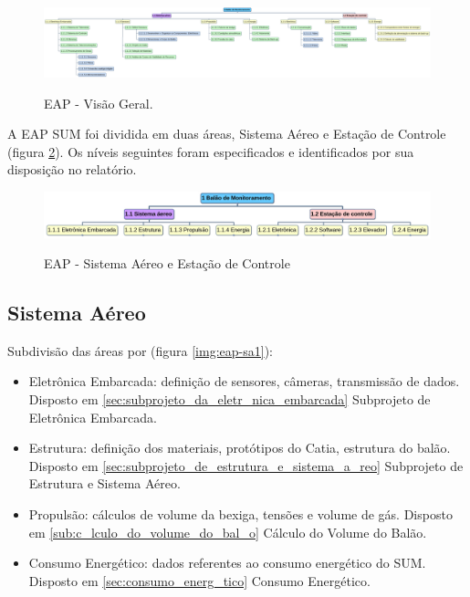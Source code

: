 	\begin{figure}[H]
		\centering
		\caption{EAP - Visão Geral.}
		\includegraphics[width=\textwidth]{figuras/eap-vg}
		\label{img:eap-vg}
	\end{figure}

	A EAP SUM foi dividida em duas áreas, Sistema Aéreo e Estação de Controle (figura \ref{img:eap-geral}). Os níveis seguintes foram especificados e identificados por sua disposição no relatório.

	\begin{figure}[H]
		\centering
		\caption{EAP - Sistema Aéreo e Estação de Controle}
		\includegraphics[width=\textwidth]{figuras/eap-geral}
		\label{img:eap-geral}
	\end{figure}

	\subsection{Sistema Aéreo}

	Subdivisão das áreas por (figura \ref{img:eap-sa1}):
	\begin{itemize}
		 \item Eletrônica Embarcada: definição de sensores, câmeras, transmissão de dados.  Disposto em \ref{sec:subprojeto_da_eletr_nica_embarcada} Subprojeto de Eletrônica Embarcada.
		\item Estrutura: definição dos materiais, protótipos do Catia, estrutura do balão. Disposto em \ref{sec:subprojeto_de_estrutura_e_sistema_a_reo} Subprojeto de Estrutura e Sistema Aéreo.
		\item Propulsão: cálculos de volume da bexiga, tensões e volume de gás. Disposto em \ref{sub:c_lculo_do_volume_do_bal_o} Cálculo do Volume do Balão.
		\item Consumo Energético: dados referentes ao consumo energético do SUM. Disposto em \ref{sec:consumo_energ_tico} Consumo Energético.

	\end{itemize}

